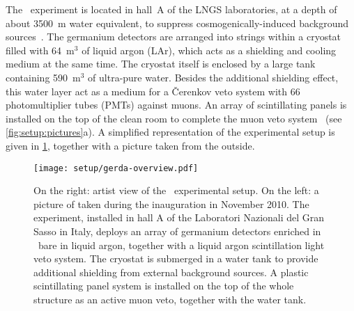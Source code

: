 The \gerda\ experiment is located in hall~A of the LNGS laboratories, at a depth of about
3500~m water equivalent, to suppress cosmogenically-induced background
sources~\cite{Wiesinger2018}. The germanium detectors are arranged into strings within a
cryostat filled with 64~m$^3$ of liquid argon (LAr), which acts as a shielding and cooling
medium at the same time. The cryostat itself is enclosed by a large tank containing
590~m$^3$ of ultra-pure water.  Besides the additional shielding effect, this water layer
act as a medium for a \v{C}erenkov veto system with 66 photomultiplier tubes (PMTs)
against muons. An array of scintillating panels is installed on the top of the clean room
to complete the muon veto system~\cite{Freund2016} (see \cref{fig:setup:pictures}a). A
simplified representation of the experimental setup is given in \cref{fig:setup:overview},
together with a picture taken from the outside.

\begin{figure}
  \centering
  \texttt{[image: setup/gerda-overview.pdf]}
  \caption{%
    On the right: artist view of the \gerda\ experimental setup. On the left: a picture of
    taken during the inauguration in November 2010. The experiment, installed in hall A of
    the Laboratori Nazionali del Gran Sasso in Italy, deploys an array of germanium detectors
    enriched in \gesix\ bare in liquid argon, together with a liquid argon scintillation
    light veto system. The cryostat is submerged in a water tank to provide additional
    shielding from external background sources. A plastic scintillating panel system is
    installed on the top of the whole structure as an active muon veto, together with the
    water tank.
  }\label{fig:setup:overview}
\end{figure}

